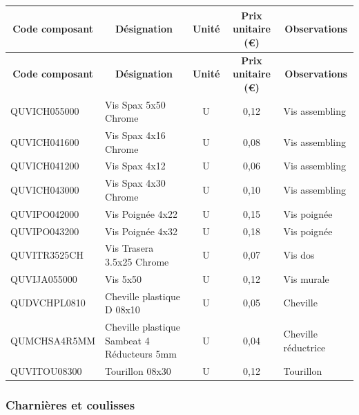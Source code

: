 \documentclass[12pt,a4paper]{article}
\begin{document}
\begin{longtable}{|p{4cm}|p{6cm}|c|c|p{3cm}|}
\hline
\multicolumn{1}{|c|}{\textbf{Code composant}} & \multicolumn{1}{c|}{\textbf{Désignation}} & \multicolumn{1}{c|}{\textbf{Unité}} & \multicolumn{1}{c|}{\textbf{Prix unitaire (€)}} & \multicolumn{1}{c|}{\textbf{Observations}} \\
\hline
\endfirsthead
\hline
\multicolumn{1}{|c|}{\textbf{Code composant}} & \multicolumn{1}{c|}{\textbf{Désignation}} & \multicolumn{1}{c|}{\textbf{Unité}} & \multicolumn{1}{c|}{\textbf{Prix unitaire (€)}} & \multicolumn{1}{c|}{\textbf{Observations}} \\
\hline
\endhead
\hline
\endfoot
QUVICH055000 & Vis Spax 5x50 Chrome & U & 0,12 & Vis assembling \\
QUVICH041600 & Vis Spax 4x16 Chrome & U & 0,08 & Vis assembling \\
QUVICH041200 & Vis Spax 4x12 & U & 0,06 & Vis assembling \\
QUVICH043000 & Vis Spax 4x30 Chrome & U & 0,10 & Vis assembling \\
QUVIPO042000 & Vis Poignée 4x22 & U & 0,15 & Vis poignée \\
QUVIPO043200 & Vis Poignée 4x32 & U & 0,18 & Vis poignée \\
QUVITR3525CH & Vis Trasera 3.5x25 Chrome & U & 0,07 & Vis dos \\
QUVIJA055000 & Vis 5x50 & U & 0,12 & Vis murale \\
QUDVCHPL0810 & Cheville plastique D 08x10 & U & 0,05 & Cheville \\
QUMCHSA4R5MM & Cheville plastique Sambeat 4 Réducteurs 5mm & U & 0,04 & Cheville réductrice \\
QUVITOU08300 & Tourillon 08x30 & U & 0,12 & Tourillon \\
\hline
\end{longtable}

\subsubsection{Charnières et coulisses}
\end{document}
